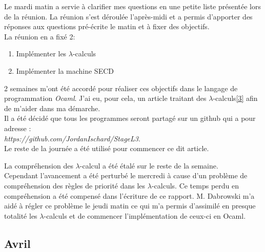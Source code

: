 \documentclass[10pt,a4paper]{article}
\begin{document}
			Le mardi matin a servie à clarifier mes questions en une petite liste présentée lors de la réunion. La réunion s'est déroulée l'après-midi et a permis d'apporter des réponses aux questions pré-écrite le matin et à fixer des objectifs. 
			\\La réunion en a fixé 2:
			\smallbreak
			\begin{enumerate}
				\item Impl\'{e}menter les $\lambda$-calculs
				\item Impl\'{e}menter la machine SECD
			\end{enumerate}
			2 semaines m'ont été accordé pour réaliser ces objectifs dans le langage de programmation \textit{Ocaml}. J'ai eu, pour cela, un article traitant des $\lambda$-calculs\hyperref[Calculi]{[3]} afin de m'aider dans ma démarche.\\
			Il a été décidé que tous les programmes seront partagé sur un github qui a pour adresse :\\ \textit{https://github.com/JordanIschard/StageL3}.\\
			Le reste de la journée a été utilisé pour commencer ce dit article.
			\medbreak
			
			La compréhension des $\lambda$-calcul a été étalé sur le reste de la semaine.
			\\
			Cependant l'avancement a été perturbé le mercredi à cause d'un problème de compréhension des règles de priorité dans les $\lambda$-calculs. Ce temps perdu en compréhension a été compensé dans l'écriture de ce rapport.
			\medbreak
			M. Dabrowski m'a aidé à régler ce problème le jeudi matin ce qui m'a permis d'assimilé en presque totalité les $\lambda$-calculs et de commencer l'implémentation de ceux-ci en Ocaml.
			
			\subsection{Avril}
			
\end{document}
